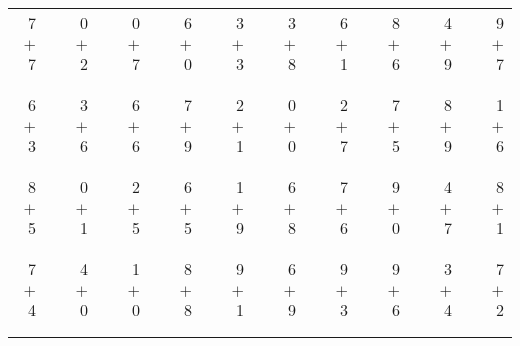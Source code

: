 \documentclass[12pt, letterpaper]{article}
\begin{document}
\begin{tabular}{rrrrrrrrrrrrrrrrrrr}
7 & & 0 & & 0 & & 6 & & 3 & & 3 & & 6 & & 8 & & 4 & & 9\\
$+$ 7 & & $+$ 2 & & $+$ 7 & & $+$ 0 & & $+$ 3 & & $+$ 8 & & $+$ 1 & & $+$ 6 & & $+$ 9 & & $+$ 7\\
\cline{1-1} \cline{3-3} \cline{5-5} \cline{7-7} \cline{9-9} \cline{11-11} \cline{13-13} \cline{15-15} \cline{17-17} \cline{19-19} \\ \\
6 & & 3 & & 6 & & 7 & & 2 & & 0 & & 2 & & 7 & & 8 & & 1\\
$+$ 3 & & $+$ 6 & & $+$ 6 & & $+$ 9 & & $+$ 1 & & $+$ 0 & & $+$ 7 & & $+$ 5 & & $+$ 9 & & $+$ 6\\
\cline{1-1} \cline{3-3} \cline{5-5} \cline{7-7} \cline{9-9} \cline{11-11} \cline{13-13} \cline{15-15} \cline{17-17} \cline{19-19} \\ \\
8 & & 0 & & 2 & & 6 & & 1 & & 6 & & 7 & & 9 & & 4 & & 8\\
$+$ 5 & & $+$ 1 & & $+$ 5 & & $+$ 5 & & $+$ 9 & & $+$ 8 & & $+$ 6 & & $+$ 0 & & $+$ 7 & & $+$ 1\\
\cline{1-1} \cline{3-3} \cline{5-5} \cline{7-7} \cline{9-9} \cline{11-11} \cline{13-13} \cline{15-15} \cline{17-17} \cline{19-19} \\ \\
7 & & 4 & & 1 & & 8 & & 9 & & 6 & & 9 & & 9 & & 3 & & 7\\
$+$ 4 & & $+$ 0 & & $+$ 0 & & $+$ 8 & & $+$ 1 & & $+$ 9 & & $+$ 3 & & $+$ 6 & & $+$ 4 & & $+$ 2\\
\cline{1-1} \cline{3-3} \cline{5-5} \cline{7-7} \cline{9-9} \cline{11-11} \cline{13-13} \cline{15-15} \cline{17-17} \cline{19-19} \\ \\
\end{tabular}
\newpage
\end{document}
